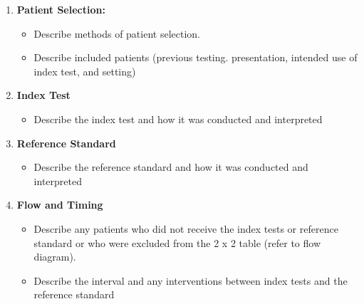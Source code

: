 \documentclass[
  11pt,
  a4paper,
  DIV=11,
  numbers=noendperiod]{scrreprt}
\providecommand{\tightlist}{%
  \setlength{\itemsep}{0pt}\setlength{\parskip}{0pt}}
\begin{document}
\begin{enumerate}
\def\labelenumi{\arabic{enumi}.}
\item
  \textbf{Patient Selection:}

  \begin{itemize}
  \item
    Describe methods of patient selection.
  \item
    Describe included patients (previous testing. presentation, intended
    use of index test, and setting)
  \end{itemize}
\item
  \textbf{Index Test}

  \begin{itemize}
  \tightlist
  \item
    Describe the index test and how it was conducted and interpreted
  \end{itemize}
\item
  \textbf{Reference Standard}

  \begin{itemize}
  \tightlist
  \item
    Describe the reference standard and how it was conducted and
    interpreted
  \end{itemize}
\item
  \textbf{Flow and Timing}

  \begin{itemize}
  \item
    Describe any patients who did not receive the index tests or
    reference standard or who were excluded from the 2 x 2 table (refer
    to flow diagram).
  \item
    Describe the interval and any interventions between index tests and
    the reference standard
  \end{itemize}
\end{enumerate}
\end{document}
